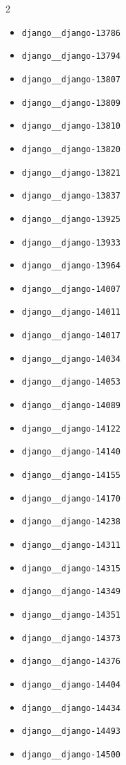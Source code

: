 \documentclass{article}
\begin{document}
\begin{multicols}{2}
\begin{itemize}
    \item \texttt{django\_\_django-13786}
    \item \texttt{django\_\_django-13794}
    \item \texttt{django\_\_django-13807}
    \item \texttt{django\_\_django-13809}
    \item \texttt{django\_\_django-13810}
    \item \texttt{django\_\_django-13820}
    \item \texttt{django\_\_django-13821}
    \item \texttt{django\_\_django-13837}
    \item \texttt{django\_\_django-13925}
    \item \texttt{django\_\_django-13933}
    \item \texttt{django\_\_django-13964}
    \item \texttt{django\_\_django-14007}
    \item \texttt{django\_\_django-14011}
    \item \texttt{django\_\_django-14017}
    \item \texttt{django\_\_django-14034}
    \item \texttt{django\_\_django-14053}
    \item \texttt{django\_\_django-14089}
    \item \texttt{django\_\_django-14122}
    \item \texttt{django\_\_django-14140}
    \item \texttt{django\_\_django-14155}
    \item \texttt{django\_\_django-14170}
    \item \texttt{django\_\_django-14238}
    \item \texttt{django\_\_django-14311}
    \item \texttt{django\_\_django-14315}
    \item \texttt{django\_\_django-14349}
    \item \texttt{django\_\_django-14351}
    \item \texttt{django\_\_django-14373}
    \item \texttt{django\_\_django-14376}
    \item \texttt{django\_\_django-14404}
    \item \texttt{django\_\_django-14434}
    \item \texttt{django\_\_django-14493}
    \item \texttt{django\_\_django-14500}

\end{itemize}
\end{multicols}
\end{document}
